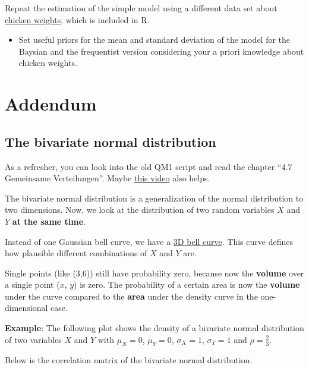 \documentclass[
]{book}
\providecommand{\tightlist}{%
  \setlength{\itemsep}{0pt}\setlength{\parskip}{0pt}}
\begin{document}
Repeat the estimation of the simple model using a different data set about
\href{https://stat.ethz.ch/R-manual/R-devel/library/datasets/html/ChickWeight.html}{chicken weights},
which is included in R.

\begin{itemize}
\tightlist
\item
  Set useful priors for the mean and standard deviation of the model
  for the Baysian and the frequentist version considering
  your a priori knowledge about chicken weights.
\end{itemize}

\section{Addendum}\label{addendum}

\subsection{The bivariate normal distribution}\label{bivariate_normal}

As a refresher, you can look into the old QM1 script and read the
chapter ``4.7 Gemeinsame Verteilungen''.
Maybe \href{https://www.youtube.com/watch?v=SP2GKq8xJ5I&ab_channel=StatisticsNinja}{this video}
also helps.

The bivariate normal distribution is a generalization of the normal distribution to two dimensions.
Now, we look at the distribution of two random variables \(X\) and \(Y\) \textbf{at the same time}.

Instead of one Gaussian bell curve, we have a
\href{https://en.wikipedia.org/wiki/Multivariate_normal_distribution\#/media/File:Multivariate_Gaussian.png}{3D bell curve}.
This curve defines how plausible different combinations of \(X\) and \(Y\) are.

Single points (like (3,6)) still have probability zero, because now the \textbf{volume} over a single point
(\(x\), \(y\)) is zero. The probability of a certain area is now the \textbf{volume} under the
curve compared to the \textbf{area} under the density curve in the one-dimensional case.

\textbf{Example}: The following plot shows the density of a bivariate normal distribution of
two variables \(X\) and \(Y\)
with \(\mu_X = 0\), \(\mu_Y = 0\), \(\sigma_X = 1\), \(\sigma_Y = 1\) and \(\rho = \frac{2}{3}\).

Below is the correlation matrix of the bivariate normal distribution.
\end{document}
